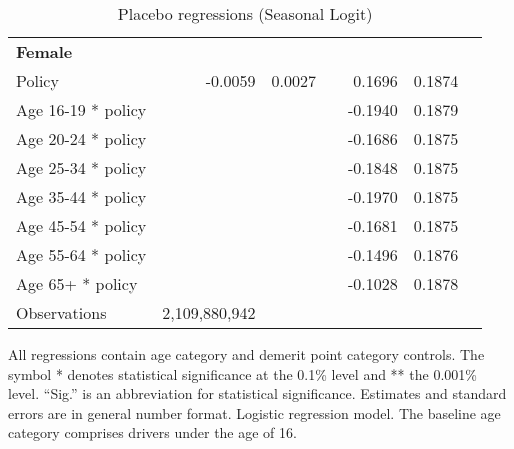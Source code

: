 \begin{table}
\begin{tabular}{l r r l r r l}
\hline 

\textbf{Female} \\ 

Policy             &  -0.0059        &  0.0027       &            &  0.1696        &  0.1874       &            \\ 
Age 16-19 * policy           & & &  &  -0.1940        &  0.1879       &            \\ 
Age 20-24 * policy           & & &  &  -0.1686        &  0.1875       &            \\ 
Age 25-34 * policy           & & &  &  -0.1848        &  0.1875       &            \\ 
Age 35-44 * policy           & & &  &  -0.1970        &  0.1875       &            \\ 
Age 45-54 * policy           & & &  &  -0.1681        &  0.1875       &            \\ 
Age 55-64 * policy           & & &  &  -0.1496        &  0.1876       &            \\ 
Age 65+ * policy           & & &  &  -0.1028        &  0.1878       &            \\ 
Observations & 2,109,880,942  \\ 


\hline 

\end{tabular} 
\caption{Placebo regressions (Seasonal Logit)} 
All regressions contain age category and demerit point category controls. 
The symbol * denotes statistical significance at the 0.1\% level 
and ** the 0.001\% level. 
``Sig.'' is an abbreviation for statistical significance. 
Estimates and standard errors are in general number format. 
Logistic regression model. 
The baseline age category comprises drivers under the age of 16. 
\label{tab:seas_logit_placebo_regs} 
\end{table} 
 
